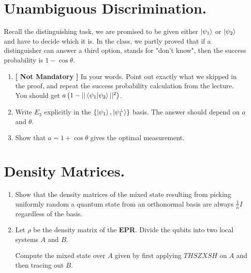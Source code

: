 \documentclass[12pt,a4paper]{article}
\begin{document}
\section{Unambiguous Discrimination.}
Recall the distinguishing task, we are promised to be given either $\ket{\psi_{1}}$ or $\ket{\psi_{2}}$ and have to decide which it is. In the class, we partly proved that if a distinguisher can answer a third option, stands for "don't know", then the success probability is $ 1 - \cos\theta$. 

\begin{enumerate}
    \item \textbf{[ Not Mandatory ] } In your words. Point out exactly what we skipped in the proof, and repeat the success probability calculation from the lecture. You should get $ a\left( 1  -||\braket{\psi_{1}| \psi_{2}}||^2 \right)$. 
    \item Write $E_{3}$ explicitly in the $\{\ket{\psi_{1}}, \ket{\psi_{1}^\perp}\}$ basis. The answer should depend on $a$ and $\theta$.
 \item Show that $a = 1 + \cos \theta $ gives the optimal measurement.  
\end{enumerate}

\section{Density Matrices.}
\begin{enumerate}
\item Show that the density matrices of the mixed state resulting from picking uniformly random a quantum state from an orthonormal basis are always $\frac{1}{n}I$ regardless of the basis.  

\item Let $\rho$ be the density matrix of the \textbf{EPR}. Divide the qubits into two local systems $A$ and $B$.
    
    Compute the mixed state over $A$ given by first applying $T H S Z XSH$ on $A$ and then tracing out $B$.    
 
\end{enumerate}

\newcommand{\channel}{\mathcal{L}\left( \mathcal{H}_{2} \right)  \rightarrow \mathcal{L}\left( \mathcal{H}_{2} \right)} 

\newpage
\end{document}
